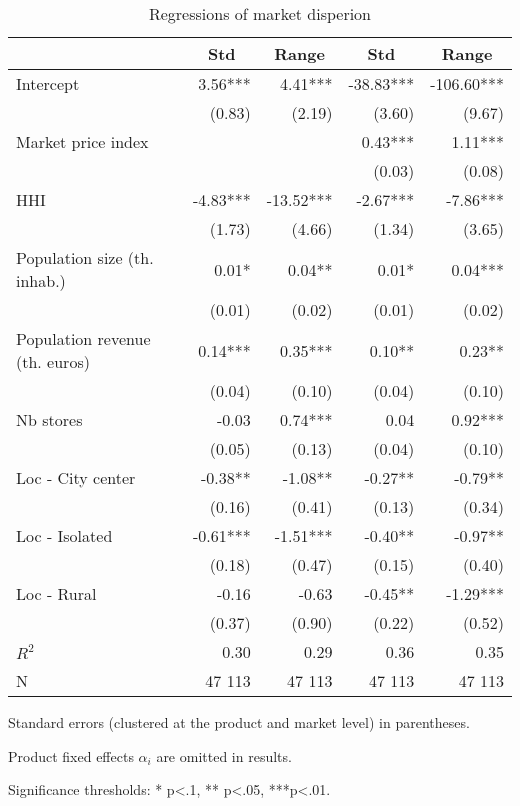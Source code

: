 \documentclass[english]{article}
\begin{document}
\begin{table}
\caption{Regressions of market disperion}
\label{tab:reg_market_dispersion}
\begin{threeparttable}
    \begin{tabular}{lrrrr}
    \toprule
    \toprule
          & \multicolumn{1}{c}{Std} & \multicolumn{1}{c}{Range} & \multicolumn{1}{c}{Std} & \multicolumn{1}{c}{Range} \\
    \midrule
Intercept & 3.56*** & 4.41*** & -38.83*** & -106.60*** \\
      & (0.83) & (2.19) & (3.60) & (9.67) \\
Market price index &       &       & 0.43*** & 1.11*** \\
      &       &       & (0.03) & (0.08) \\
HHI   & -4.83*** & -13.52*** & -2.67*** & -7.86*** \\
      & (1.73) & (4.66) & (1.34) & (3.65) \\
Population size (th. inhab.) & 0.01* & 0.04** & 0.01* & 0.04*** \\
      & (0.01) & (0.02) & (0.01) & (0.02) \\
Population revenue (th. euros) & 0.14*** & 0.35*** & 0.10** & 0.23** \\
      & (0.04) & (0.10) & (0.04) & (0.10) \\
Nb stores & -0.03 & 0.74*** & 0.04  & 0.92*** \\
      & (0.05) & (0.13) & (0.04) & (0.10) \\
Loc - City center & -0.38** & -1.08** & -0.27** & -0.79** \\
      & (0.16) & (0.41) & (0.13) & (0.34) \\
Loc - Isolated & -0.61*** & -1.51*** & -0.40** & -0.97** \\
      & (0.18) & (0.47) & (0.15) & (0.40) \\
Loc - Rural & -0.16 & -0.63 & -0.45** & -1.29*** \\
      & (0.37) & (0.90) & (0.22) & (0.52) \\
\midrule
$R^2$    & 0.30  & 0.29  & 0.36  & 0.35 \\
N     & 47 113 & 47 113 & 47 113 & 47 113 \\
    \bottomrule
    \bottomrule
\end{tabular}
\begin{tablenotes}
      \small
	  \item Standard errors (clustered at the product and market level) in parentheses.
    \item Product fixed effects $\alpha_i$ are omitted in results.
	  \item Significance thresholds: * p<.1, ** p<.05, ***p<.01.
\end{tablenotes}
\end{threeparttable}
\end{table}
\end{document}
